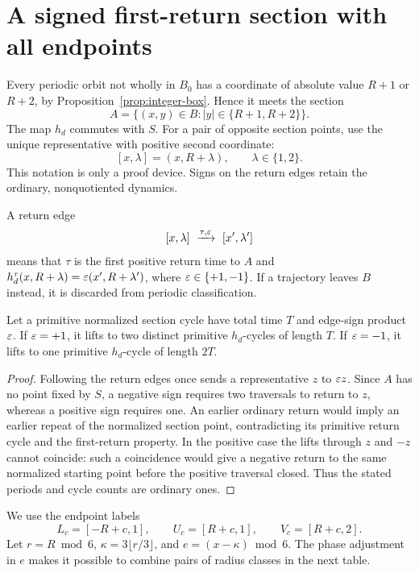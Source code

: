 \section{A signed first-return section with all endpoints}\label{sec:boundary}

Every periodic orbit not wholly in $B_0$ has a coordinate of absolute
value $R+1$ or $R+2$, by Proposition~\ref{prop:integer-box}. Hence it
meets the section
\begin{equation}\label{eq:section}
 A=\{(x,y)\in B: |y|\in\{R+1,R+2\}\}.
\end{equation}
The map $h_d$ commutes with $S$. For a pair of opposite section
points, use the unique representative with positive second coordinate:
\[
 [x,\lambda]=(x,R+\lambda),\qquad \lambda\in\{1,2\}.
\]
This notation is only a proof device. Signs on the return edges
retain the ordinary, nonquotiented dynamics.

A return edge
\[
 [x,\lambda]\ \xto{\tau,\eps}\ [x',\lambda']
\]
means that $\tau$ is the first positive return time to $A$ and
$h_d^\tau(x,R+\lambda)=\varepsilon(x',R+\lambda')$, where
$\varepsilon\in\{+1,-1\}$. If a trajectory leaves $B$ instead, it is
discarded from periodic classification.

\begin{lemma}\label{lem:lift}
Let a primitive normalized section cycle have total time $T$ and
edge-sign product $\varepsilon$. If $\varepsilon=+1$, it lifts to two distinct
primitive $h_d$-cycles of length $T$. If $\varepsilon=-1$, it lifts to one
primitive $h_d$-cycle of length $2T$.
\end{lemma}
\begin{proof}
Following the return edges once sends a representative $z$ to
$\varepsilon z$. Since $A$ has no point fixed by $S$, a negative sign
requires two traversals to return to $z$, whereas a positive sign
requires one. An earlier ordinary return would imply an earlier
repeat of the normalized section point, contradicting its primitive
return cycle and the first-return property. In the positive case
the lifts through $z$ and $-z$ cannot coincide: such a coincidence
would give a negative return to the same normalized starting point
before the positive traversal closed. Thus the stated periods and
cycle counts are ordinary ones.
\end{proof}

We use the endpoint labels
\begin{equation}\label{eq:endpoints}
 L_c=[-R+c,1],\qquad U_c=[R+c,1],\qquad V_c=[R+c,2].
\end{equation}
Let $r=R\bmod6$, $\kappa=3\lfloor r/3\rfloor$, and
$e=(x-\kappa)\bmod6$. The phase adjustment in $e$ makes it possible
to combine pairs of radius classes in the next table.

